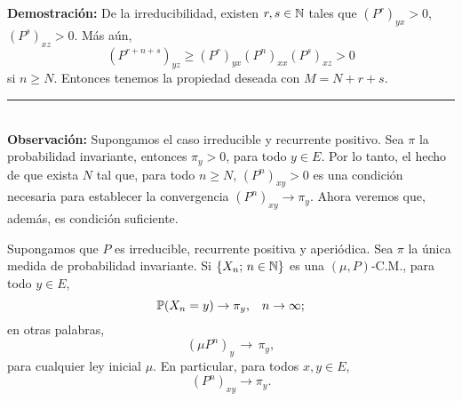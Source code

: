 \textbf{Demostración: }De la irreducibilidad, existen $r,s\in \mathbb N$ tales que $(P^r)_{yx} >0$, $(P^s)_{xz}>0$. Más aún,
\[(P^{r+n+s})_{yz}\geq (P^r)_{yx}(P^n)_{xx}(P^s)_{xz}>0\]
si $n\geq N$. Entonces tenemos la propiedad deseada con $M=N+r+s$.\\
\rule{0.7em}{0.7em}\\ \newline
\textbf{Observación: }Supongamos el caso irreducible y recurrente positivo. Sea $\pi$ la probabilidad invariante, entonces $\pi_y>0$, para todo $y\in E$. Por lo tanto, el hecho de que exista $N$ tal que, para todo $n\geq N$, $(P^n)_{xy}>0$ es una condición necesaria para establecer la convergencia $(P^n)_{xy}\rightarrow \pi_y$. Ahora veremos que, además, es condición suficiente.\\ \newline
\begin{teorema}
Supongamos que $P$ es irreducible, recurrente positiva y aperiódica. Sea $\pi$ la única medida de probabilidad invariante. Si $\{X_n;\,n\in\mathbb N\}$ es una $(\mu,P)$-C.M., para todo $y\in E$,
\[\mathbb{P}(X_n = y)\rightarrow \pi_y,\hspace{0.3cm}n\rightarrow \infty;\]
en otras palabras, 
\[(\mu P^n)_y \, \rightarrow\,\pi_y,\] 
para cualquier ley inicial $\mu$. En particular, para todos $x,y\in E$,
\[(P^n)_{xy}\rightarrow \pi_y.\]
\end{teorema}

